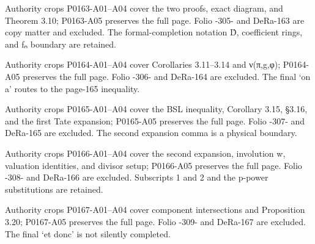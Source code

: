 \documentclass[11pt,a4paper]{article}
\begin{document}
\par\medskip
\hypertarget{D018-P0163}{}
\par\smallskip
Authority crops P0163-A01–A04 cover the two proofs, exact diagram, and Theorem 3.10; P0163-A05 preserves the full page. Folio -305- and DeRa-163 are copy matter and excluded. The formal-completion notation D̂, coefficient rings, and fₙ boundary are retained.


\par\medskip
\hypertarget{D018-P0164}{}
\par\smallskip
Authority crops P0164-A01–A04 cover Corollaries 3.11–3.14 and ν(π,g,φ); P0164-A05 preserves the full page. Folio -306- and DeRa-164 are excluded. The final ‘on a’ routes to the page-165 inequality.


\par\medskip
\hypertarget{D018-P0165}{}
\par\smallskip
Authority crops P0165-A01–A04 cover the BSL inequality, Corollary 3.15, §3.16, and the first Tate expansion; P0165-A05 preserves the full page. Folio -307- and DeRa-165 are excluded. The second expansion comma is a physical boundary.


\par\medskip
\hypertarget{D018-P0166}{}
\par\smallskip
Authority crops P0166-A01–A04 cover the second expansion, involution w, valuation identities, and divisor setup; P0166-A05 preserves the full page. Folio -308- and DeRa-166 are excluded. Subscripts 1 and 2 and the p-power substitutions are retained.


\par\medskip
\hypertarget{D018-P0167}{}
\par\smallskip
Authority crops P0167-A01–A04 cover component intersections and Proposition 3.20; P0167-A05 preserves the full page. Folio -309- and DeRa-167 are excluded. The final ‘et donc’ is not silently completed.
\end{document}
